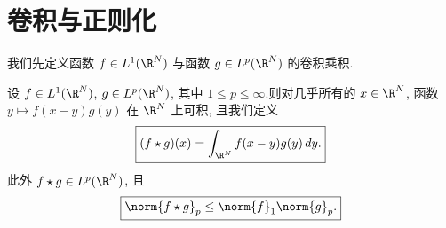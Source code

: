 \section{卷积与正则化}
\label{sec:4.4}

我们先定义函数 $f\in L^1(\R^N)$ 与函数 $g\in L^p(\R^N)$ 的卷积乘积.

\begin{keytheorem}[Young]
\label{thm:4.15}
设 $f\in L^1(\R^N)$, $g\in L^p(\R^N)$, 其中 $1\le p\le\infty$.则对几乎所有的
$x\in\R^N$, 函数 $y\mapsto f(x-y)g(y)$ 在 $\R^N$ 上可积, 且我们定义
\begin{equation*}
\boxed{(f\star g)(x)=\int_{\R^N}f(x-y)g(y)\,dy.}
\end{equation*}
此外 $f\star g\in L^p(\R^N)$, 且
\begin{equation*}
\boxed{\norm{f\star g}_p\le\norm{f}_1\norm{g}_p.}
\end{equation*}
\end{keytheorem}

